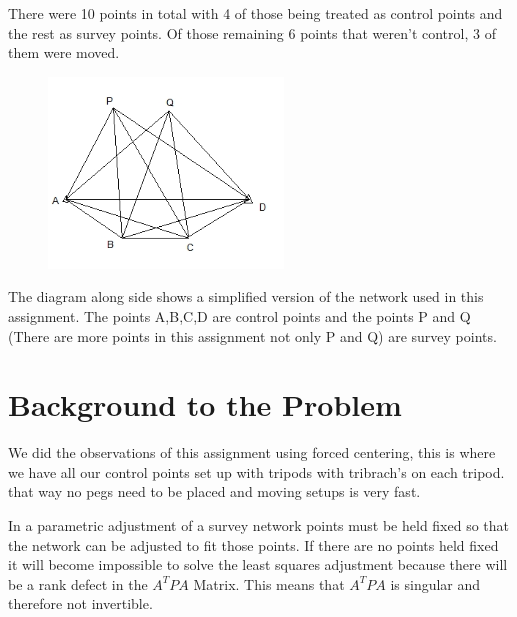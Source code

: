 \documentclass[12pt,a4paper]{article}
\begin{document}
	There were 10 points in total with 4 of those being treated as control points and the rest as survey points. Of those remaining 6 points that weren't control, 3 of them were moved.\\
	\begin{minipage}{0.5\linewidth}

	\begin{figure}[H]
		\centering
		\includegraphics[width=0.6\linewidth]{images/unnamed}
		\label{fig:figure}
	\end{figure}

	\end{minipage}
	\begin{minipage}{0.5\linewidth}
		
	The diagram along side shows a simplified version of the network used in this assignment. The points A,B,C,D are control points and the points P and Q (There are more points in this assignment not only P and Q) are survey points.
		
	\end{minipage}
	
	\section{Background to the Problem}
	
	We did the observations of this assignment using forced centering, this is where we have all our control points set up with tripods with tribrach's on each tripod. that way no pegs need to be placed and moving setups is very fast. 
	
	In a parametric adjustment of a survey network points must be held fixed so that the network can be adjusted to fit those points. If there are no points held fixed it will become impossible to solve the least squares adjustment because there will be a rank defect in the $A^TPA$ Matrix. This means that $A^TPA$ is singular and therefore not invertible.
	
\end{document}

